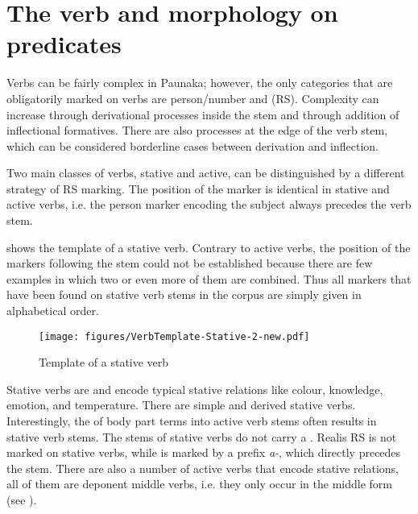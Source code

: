 

\chapter[The verb and morphology on predicates]{The verb and morphology on predicates}\label{sec:Verbs}

Verbs can be fairly complex in Paunaka; however, the only categories that are obligatorily marked on verbs are person/number and  (RS). Complexity can increase through derivational processes inside the stem and through addition of inflectional formatives. There are also processes at the edge of the verb stem, which can be considered borderline cases between derivation and inflection.

Two main classes of verbs, stative and active, can be distinguished by a different strategy of RS marking. The position of the  marker is identical in stative and active verbs, i.e. the person marker encoding the subject always precedes the verb stem.

 shows the template of a stative verb. Contrary to active verbs, the position of the markers following the stem could not be established because there are few examples in which two or even more of them are combined. Thus all markers that have been found on stative verb stems in the corpus are simply given in alphabetical order.

\begin{figure}[!ht]
\texttt{[image: figures/VerbTemplate-Stative-2-new.pdf]}
\caption{Template of a stative verb}
\label{fig:VerbTemplate-Stative}
\end{figure}

Stative verbs are  and encode typical stative relations like colour, knowledge, emotion, and temperature. There are simple and derived stative verbs. Interestingly, the  of body part terms into active verb stems often results in stative verb stems. The stems of stative verbs do not carry a . Realis RS is not marked on stative verbs, while  is marked by a prefix \textit{a-}, which directly precedes the stem. There are also a number of active verbs that encode stative relations, all of them are deponent middle verbs, i.e. they only occur in the middle form (see ).


